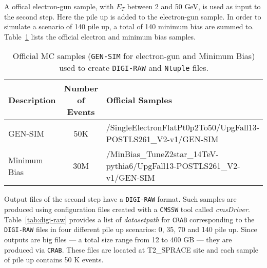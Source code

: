 \documentclass[a4paper,12pt,oneside]{article}
\begin{document}
                   A offical electron-gun sample, with $E_{T}$ between 2 and 50 GeV, is used as input to the second step. Here the
                   pile up is added to the electron-gun sample. In order to simulate a scenario of 140 pile up, a total of 140
                   minimum bias are summed to. Table~\ref{tab:gen-sim-minbias} lists the official electron and minimum bias samples.

                   \begin{table}[!htb]
                   \centering
                   \scriptsize
                     \caption{Official MC samples (\texttt{GEN-SIM} for electron-gun and Minimum Bias) used to create
                       \texttt{DIGI-RAW} and \texttt{Ntuple} files.}
                     \label{tab:gen-sim-minbias}
                     \begin{tabular}{lcl}
\hline
{\bf Description} & {\bf Number of Events} & {\bf Official Samples} \\ \hline \hline
GEN-SIM           & 50K                    & /SingleElectronFlatPt0p2To50/UpgFall13-POSTLS261\_V2-v1/GEN-SIM \\ \hline
Minimum Bias      & 30M                    & /MinBias\_TuneZ2star\_14TeV-pythia6/UpgFall13-POSTLS261\_V2-v1/GEN-SIM \\ \hline
                     \end{tabular}
                   \end{table}

                   Output files of the second step have a \texttt{DIGI-RAW} format. Such samples are produced using configuration
                   files created with a \texttt{CMSSW} tool called {\it cmsDriver}. Table~\ref{tab:digi-raw} provides a list of
                   {\it datasetpath} for \texttt{CRAB} corresponding to the \texttt{DIGI-RAW} files in four different pile up
                   scenarios: 0, 35, 70 and 140 pile up. Since outputs are big files --- a total size range from 12 to 400 GB ---
                   they are produced via \texttt{CRAB}. These files are located at T2\_SPRACE site and each sample of pile up
                   contains 50 K events.
\end{document}
